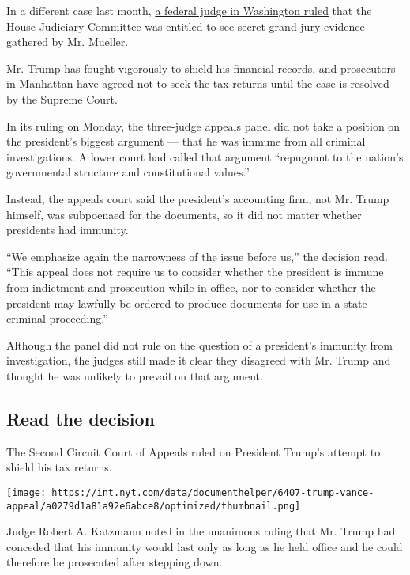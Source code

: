 In a different case last month,
\href{https://www.nytimes.com/2019/10/25/us/politics/house-impeachment-subpoenas.html}{a
federal judge in Washington ruled} that the House Judiciary Committee
was entitled to see secret grand jury evidence gathered by Mr. Mueller.

\href{https://www.nytimes.com/2019/08/13/us/politics/trump-house-lawsuits.html?module=inline}{Mr.
Trump has fought vigorously to shield his financial records}, and
prosecutors in Manhattan have agreed not to seek the tax returns until
the case is resolved by the Supreme Court.

In its ruling on Monday, the three-judge appeals panel did not take a
position on the president's biggest argument --- that he was immune from
all criminal investigations. A lower court had called that argument
``repugnant to the nation's governmental structure and constitutional
values.''

Instead, the appeals court said the president's accounting firm, not Mr.
Trump himself, was subpoenaed for the documents, so it did not matter
whether presidents had immunity.

``We emphasize again the narrowness of the issue before us,'' the
decision read. ``This appeal does not require us to consider whether the
president is immune from indictment and prosecution while in office, nor
to consider whether the president may lawfully be ordered to produce
documents for use in a state criminal proceeding.''

Although the panel did not rule on the question of a president's
immunity from investigation, the judges still made it clear they
disagreed with Mr. Trump and thought he was unlikely to prevail on that
argument.

\hypertarget{read-the-decision}{%
\subsection{Read the decision}\label{read-the-decision}}

The Second Circuit Court of Appeals ruled on President Trump's attempt
to shield his tax returns.

\texttt{[image: https://int.nyt.com/data/documenthelper/6407-trump-vance-appeal/a0279d1a81a92e6abce8/optimized/thumbnail.png]}

Judge Robert A. Katzmann noted in the unanimous ruling that Mr. Trump
had conceded that his immunity would last only as long as he held office
and he could therefore be prosecuted after stepping down.

